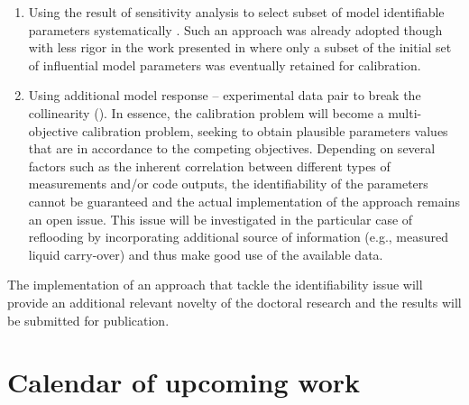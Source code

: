\documentclass[11pt,titlepage]{article}
\begin{document}
\begin{enumerate}
    \item Using the result of sensitivity analysis to select subset of model 
    identifiable parameters systematically 
    \cite{Sin2010, Brun2001, Brun2002}. 
    Such an approach was already adopted though with less rigor in the 
    work presented in \cite{Wicaksono2016} where only a subset of the 
    initial set of influential model parameters was eventually retained 
    for calibration.
    \item Using additional model response – experimental data pair to break the 
    collinearity (\cite{Reichert2012, Arendt2012}). 
    In essence, the calibration problem will become a 
    multi-objective calibration problem, seeking to obtain plausible parameters 
    values that are in accordance to the competing objectives. 
    Depending on several factors such as the inherent correlation between 
    different types of measurements and/or code outputs, the identifiability 
    of the parameters cannot be guaranteed and the actual implementation of the 
    approach remains an open issue. This issue will be investigated in the 
    particular case of reflooding by incorporating additional source of information 
    (e.g., measured liquid carry-over) and thus make good use of the available data.    
\end{enumerate}

The implementation of an approach that tackle the identifiability issue will provide 
an additional relevant novelty of the doctoral research and the results will be 
submitted for publication. 



\section{Calendar of upcoming work}
\end{document}
